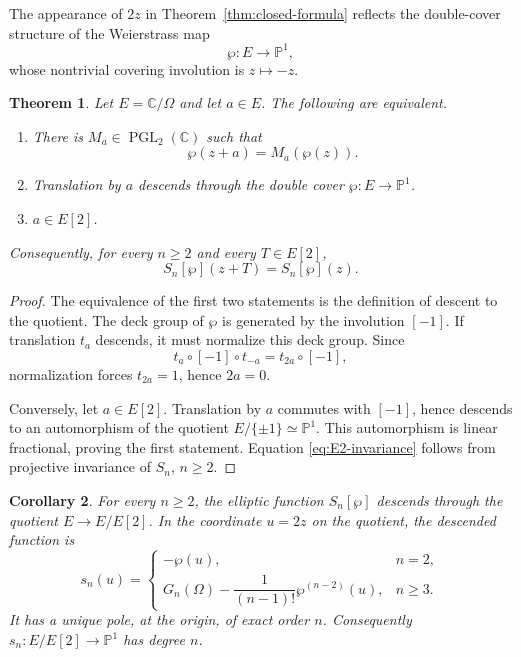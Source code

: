 \documentclass[11pt]{amsart}
\newtheorem{thm}{Theorem}[section]
\newtheorem{cor}[thm]{Corollary}
\theoremstyle{definition}
\theoremstyle{remark}
\numberwithin{equation}{section}
\begin{document}
The appearance of \(2z\) in Theorem~\ref{thm:closed-formula} reflects the
double-cover structure of the Weierstrass map
\[
\wp:E\longrightarrow \mathbb{P}^1,
\]
whose nontrivial covering involution is \(z\mapsto -z\).

\begin{thm}\label{thm:two-torsion-symmetry}
Let $E=\mathbb C/\Omega$ and let $a\in E$. The following are equivalent.
\begin{enumerate}
\item There is $M_a\in\operatorname{PGL}_2(\mathbb C)$ such that
\[
\wp(z+a)=M_a(\wp(z)).
\]
\item Translation by $a$ descends through the double cover $\wp:E\to\mathbb P^1$.
\item $a\in E[2]$.
\end{enumerate}
Consequently, for every $n\geq2$ and every $T\in E[2]$,
\begin{equation}\label{eq:E2-invariance}
S_n[\wp](z+T)=S_n[\wp](z).
\end{equation}
\end{thm}

\begin{proof}
The equivalence of the first two statements is the definition of descent to the quotient. The deck group of $\wp$ is generated by the involution $[-1]$. If translation $t_a$ descends, it must normalize this deck group. Since
\[
t_a\circ[-1]\circ t_{-a}=t_{2a}\circ[-1],
\]
normalization forces $t_{2a}=1$, hence $2a=0$.

Conversely, let $a\in E[2]$. Translation by $a$ commutes with $[-1]$, hence descends to an automorphism of the quotient $E/\{\pm1\}\simeq\mathbb P^1$. This automorphism is linear fractional, proving the first statement. Equation \eqref{eq:E2-invariance} follows from projective invariance of $S_n$, $n\geq2$.
\end{proof}


\begin{cor}\label{cor:descent-degree}
For every $n\geq2$, the elliptic function $S_n[\wp]$ descends through the quotient $E\to E/E[2]$. In the coordinate $u=2z$ on the quotient, the descended function is
\[
s_n(u)=
\begin{cases}
-\wp(u),&n=2,\\
G_n(\Omega)-\dfrac{1}{(n-1)!}\wp^{(n-2)}(u),&n\geq3.
\end{cases}
\]
It has a unique pole, at the origin, of exact order $n$. Consequently $s_n:E/E[2]\to\mathbb P^1$ has degree $n$.
\end{cor}
\end{document}
